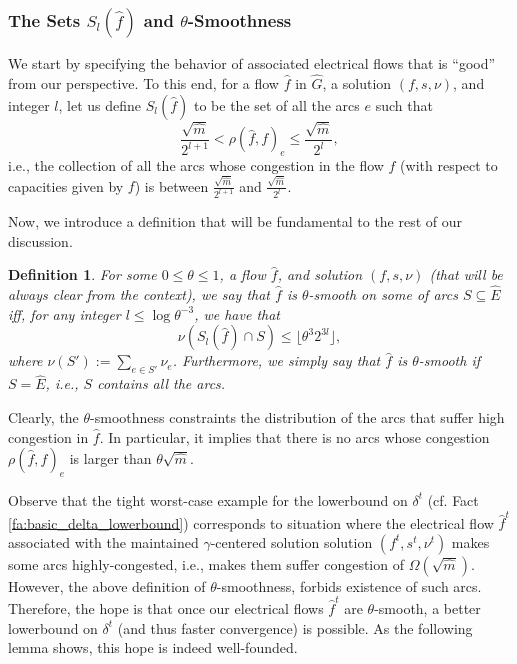 \documentclass[11pt, letterpaper]{article}
\newtheorem{definition}[theorem]{Definition}
\newcommand{\floor}[1]{\lfloor #1 \rfloor}
\newcommand{\hG}{\widehat{G}}
\newcommand{\hE}{\widehat{E}}
\newcommand{\hm}{\widehat{m}}
\newcommand{\Cset}[2]{S_{#1}(#2)}
\newcommand{\hgamma}{\hat{\gamma}}
\newcommand{\vnu}{\boldsymbol{\mathit{\nu}}}
\newcommand{\ff}{\boldsymbol{\mathit{f}}}
\newcommand{\hff}{\boldsymbol{\mathit{\hat{f}}}}
\renewcommand{\ss}{\boldsymbol{\mathit{s}}}
\begin{document}
\subsubsection*{The Sets $\Cset{l}{\hff}$ and $\theta$-Smoothness}


We start by specifying the behavior of associated electrical flows that is ``good'' from our perspective. To this end, for a flow $\hff$ in $\hG$, a solution $(\ff,\ss,\vnu)$, and integer $l$, let us define $\Cset{l}{\hff}$ to be the set of all the arcs $e$ such that
\begin{equation}
\label{eq:def_of_C}
\frac{\sqrt{\hm}}{2^{l+1}}< \rho(\hff,\ff)_e \leq \frac{\sqrt{\hm}}{2^{l}},
\end{equation}
i.e., the collection of all the arcs whose congestion in the flow $\hff$ (with respect to capacities given by $\ff$) is between $\frac{\sqrt{\hm}}{2^{l+1}}$ and $\frac{\sqrt{\hm}}{2^{l}}$.


Now, we introduce a definition that will be fundamental to the rest of our discussion.
\begin{definition}
\label{def:smoothness}
For some $0\leq \theta \leq 1$, a flow $\hff$, and solution $(\ff,\ss,\vnu)$ (that will be always clear from the context), we say that $\hff$ is {\em $\theta$-smooth on some of arcs $S\subseteq \hE$} iff, for any integer $l\leq \log \theta^{-3}$, we have that
\[
\vnu(\Cset{l}{\hff}\cap S)\leq \floor{\theta^3 2^{3l}},
\]
where $\vnu(S'):=\sum_{e\in S'} \nu_e$. 
Furthermore, we simply say that $\hff$ is {\em $\theta$-smooth} if $S=\hE$, i.e., $S$ contains all the arcs. 
\end{definition} 
Clearly, the $\theta$-smoothness constraints the distribution of the arcs that suffer high congestion in $\hff$. In particular, it implies that there is no arcs whose congestion $\rho(\hff,\ff)_e$ is larger than $\theta \sqrt{\hm}$. 

Observe that the tight worst-case example for the lowerbound on $\delta^t$ (cf. Fact \ref{fa:basic_delta_lowerbound}) corresponds to situation where the electrical flow $\hff^t$ associated with the maintained $\hgamma$-centered solution solution $(\ff^t,\ss^t,\vnu^t)$ makes some arcs highly-congested, i.e., makes them suffer congestion of $\Omega(\sqrt{\hm})$. However, the above definition of $\theta$-smoothness, forbids existence of such arcs. Therefore, the hope is that once our electrical flows $\hff^t$ are $\theta$-smooth, a better lowerbound on $\delta^t$ (and thus faster convergence) is possible. As the following lemma shows, this hope is indeed well-founded.
\end{document}
